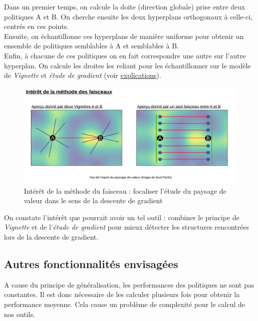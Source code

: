 \documentclass[12pt]{article}
\begin{document}
Dans un premier temps, on calcule la doite (direction globale) prise entre deux politiques A et B. On cherche ensuite les deux hyperplans orthogonaux à celle-ci, centrés en ces points. \\

Ensuite, on échantillonne ces hyperplans de manière uniforme pour obtenir un ensemble de politiques semblables à A et semblables à B. \\

Enfin, à chacune de ces politiques on en fait correspondre une autre sur l'autre hyperplan. On calcule les droites les reliant pour les échantillonner sur le modèle de \emph{Vignette} et \emph{étude de gradient} (voir \hyperref[fig:ligne1]{explications}). \\

\begin{figure}[htp]
    \centering
    \includegraphics[width=18cm]{Images/faisceaux_interet}
    \caption{Intérêt de la méthode du faisceau : focaliser l'étude du paysage de valeur dans le sens de la descente de gradient}
    \label{fig:faisceauxInteret}
\end{figure}

On constate l'intérêt que pourrait avoir un tel outil : combiner le principe de \emph{Vignette} et de l'\emph{étude de gradient} pour mieux détecter les structures rencontrées lors de la descente de gradient. \\

\subsection{Autres fonctionnalités envisagées}

A cause du principe de généralisation, les performances des politiques ne sont pas constantes. Il est donc nécessaire de les calculer plusieurs fois pour obtenir la performance moyenne. Cela cause un problème de complexité pour le calcul de nos outils. \\
\end{document}
